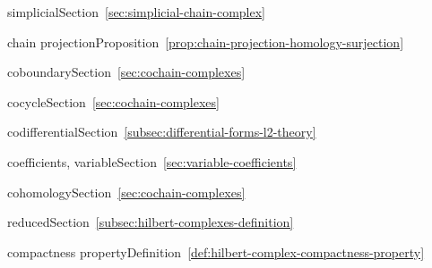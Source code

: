 \par\noindent\hspace*{1em}\label{index:chain-simplicial}{simplicial}\quad Section~\ref{sec:simplicial-chain-complex}

\par\noindent\hspace*{0em}\label{index:chain-projection}{chain projection}\quad Proposition~\ref{prop:chain-projection-homology-surjection}

\par\noindent\hspace*{0em}\label{index:coboundary}{coboundary}\quad Section~\ref{sec:cochain-complexes}

\par\noindent\hspace*{0em}\label{index:cocycle}{cocycle}\quad Section~\ref{sec:cochain-complexes}

\par\noindent\hspace*{0em}\label{index:codifferential}{codifferential}\quad Section~\ref{subsec:differential-forms-l2-theory}

\par\noindent\hspace*{0em}\label{index:coefficients-variable}{coefficients, variable}\quad Section~\ref{sec:variable-coefficients}

\par\noindent\hspace*{0em}\label{index:cohomology}{cohomology}\quad Section~\ref{sec:cochain-complexes}

\par\noindent\hspace*{1em}\label{index:cohomology-reduced}{reduced}\quad Section~\ref{subsec:hilbert-complexes-definition}

\par\noindent\hspace*{0em}\label{index:compactness-property}{compactness property}\quad Definition~\ref{def:hilbert-complex-compactness-property}

